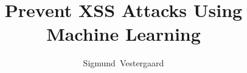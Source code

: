 \documentclass[10pt,journal,compsoc]{IEEEtran}
\begin{document}
%
\title{Prevent XSS Attacks Using Machine Learning}
%
%
%
%

\author{Sigmund~Vestergaard\\}%
\end{document}
